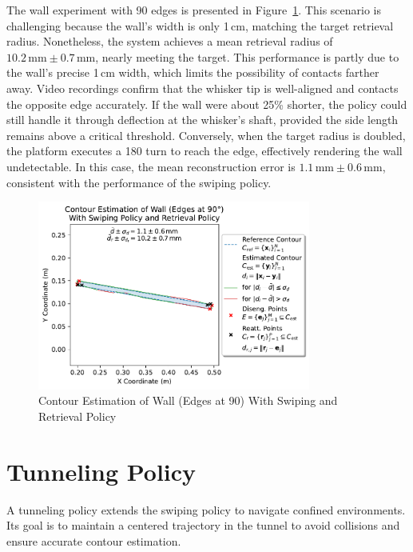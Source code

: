 The wall experiment with 90\degree{} edges is presented in Figure~\ref{fig:experiment-wall-edges-90deg-swiping-retrieval}.
This scenario is challenging because the wall's width is only 1\,cm, matching the target retrieval radius.
Nonetheless, the system achieves a mean retrieval radius of $10.2\,\text{mm} \pm 0.7\,\text{mm}$, nearly meeting the target.
This performance is partly due to the wall's precise 1\,cm width, which limits the possibility of contacts farther away.
Video recordings confirm that the whisker tip is well-aligned and contacts the opposite edge accurately.
If the wall were about 25\% shorter, the policy could still handle it through deflection at the whisker's shaft, provided the side length remains above a critical threshold.
Conversely, when the target radius is doubled, the platform executes a 180\degree{} turn to reach the edge, effectively rendering the wall undetectable.
In this case, the mean reconstruction error is $1.1\,\text{mm} \pm 0.6\,\text{mm}$, consistent with the performance of the swiping policy.

\begin{figure}[!htb]
    \centering
    \includegraphics[width=0.8\textwidth]{figures/experiments/wall-edges-90deg-swiping-retrieval}
    \caption{Contour Estimation of Wall (Edges at 90\degree{}) With Swiping and Retrieval Policy}
    \label{fig:experiment-wall-edges-90deg-swiping-retrieval}
\end{figure}


\section{Tunneling Policy}
A tunneling policy extends the swiping policy to navigate confined environments.
Its goal is to maintain a centered trajectory in the tunnel to avoid collisions and ensure accurate contour estimation.

